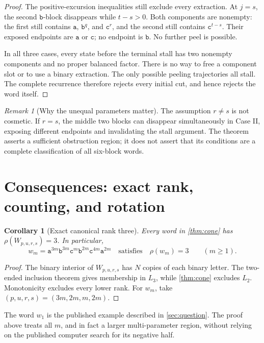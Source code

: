 \documentclass[11pt,letterpaper]{article}
\numberwithin{equation}{section}
\newtheorem{corollary}[theorem]{Corollary}
\theoremstyle{definition}
\theoremstyle{remark}
\newtheorem{remark}[theorem]{Remark}
\renewcommand{\aa}{\mathtt a}
\newcommand{\bb}{\mathtt b}
\newcommand{\cc}{\mathtt c}
\newcommand{\rank}{\rho}
\begin{document}
\begin{proof}
The positive-excursion inequalities still exclude every extraction.
At \(j=s\), the second \(\bb\)-block disappears while
\(t-s>0\). Both components are nonempty: the first still contains
\(\aa\), \(\bb^q\), and \(\cc^r\), and the second still contains
\(\cc^{t-s}\). Their exposed endpoints are \(\aa\) or \(\cc\);
no endpoint is \(\bb\). No further peel is possible.

In all three cases, every state before the terminal stall has two
nonempty components and no proper balanced factor. There is no way to
free a component slot or to use a binary extraction. The only possible
peeling trajectories all stall. The complete recurrence therefore
rejects every initial cut, and hence rejects the word itself.
\end{proof}

\begin{remark}[Why the unequal parameters matter]
The assumption \(r\ne s\) is not cosmetic. If \(r=s\), the middle two
blocks can disappear simultaneously in Case II, exposing different
endpoints and invalidating the stall argument. The theorem asserts a
sufficient obstruction region; it does not assert that its conditions
are a complete classification of all six-block words.
\end{remark}

\section{Consequences: exact rank, counting, and rotation}
\label{sec:consequences}

\begin{corollary}[Exact canonical rank three]
\label{cor:rank}
Every word in \cref{thm:cone} has \(\rank(W_{p,u,r,s})=3\).
In particular,
\begin{equation}\label{eq:scaled}
 w_m=\aa^{3m}\bb^{3m}\cc^m\bb^{2m}\cc^{4m}\aa^{2m}
 \quad\text{satisfies}\quad \rank(w_m)=3\qquad(m\geq1).
\end{equation}
\end{corollary}
\begin{proof}
The binary interior of \(W_{p,u,r,s}\) has \(N\) copies of each binary
letter. The two-ended inclusion theorem gives membership in \(L_3\),
while \cref{thm:cone} excludes \(L_2\). Monotonicity excludes every
lower rank. For \(w_m\), take
\((p,u,r,s)=(3m,2m,m,2m)\).
\end{proof}

The word \(w_1\) is the published example described in
\cref{sec:question}. The proof above treats all \(m\), and in fact a
larger multi-parameter region, without relying on the published
computer search for its negative half.
\end{document}
